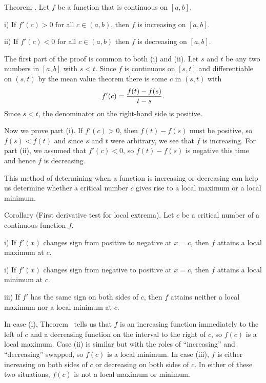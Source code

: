 \edef\thmincrdecr{\the\thmcount}
\proclaim Theorem \advthm. Let $f$ be a function that is continuous on $[a,b]$.
\medskip
\item{i)} If $f'(c) > 0$ for all $c\in (a,b)$, then $f$ is increasing on $[a,b]$.
\smallskip
\item{ii)} If $f'(c) < 0$ for all $c\in (a,b)$ then $f$ is decreasing on $[a,b]$.
\medskip

\proof
The first part of
the proof is common to both (i) and (ii).
Let $s$ and $t$ be any two numbers in $[a,b]$ with $s<t$.
Since $f$ is continuous on $[s,t]$ and differentiable
on $(s,t)$ by the mean value theorem there is some $c$ in $(s,t)$ with
$$f'(c) = {f(t) - f(s) \over t-s}.$$
Since $s<t$, the denominator on the right-hand side is positive.

Now we prove part (i). If $f'(c) > 0$, then $f(t) - f(s)$ must be positive, so $f(s)  <f(t)$
and since $s$ and $t$ were arbitrary, we see that $f$ is increasing. For part (ii), we assumed
that $f'(c) < 0$, so $f(t) - f(s)$ is negative this time and hence $f$ is decreasing.\slug

This method of determining when a function is increasing or decreasing can help us determine whether
a critical number $c$ gives rise to a local maximum or a local minimum.

\edef\corfirstderivtest{\the\thmcount}
\parenproclaim Corollary {\advthm} (First derivative test for local extrema).
Let $c$ be a critical number of a continuous
function $f$.
\medskip
\item{i)} If $f'(x)$ changes sign from positive to negative at $x=c$, then $f$ attains a local maximum
at $c$.
\smallskip
\item{i)} If $f'(x)$ changes sign from negative to positive at $x=c$, then $f$ attains a local minimum
at $c$.
\smallskip
\item{iii)} If $f'$ has the same sign on both sides of $c$, then $f$ attains neither a local maximum nor
a local minimum at $c$.
\medskip

\proof In case (i), Theorem~{\thmincrdecr} tells us that $f$ is an increasing function immediately to the
left of $c$ and a decreasing function on the interval to the right of $c$, so $f(c)$ is a local maximum.
Case (ii) is similar but with the roles of ``increasing'' and ``decreasing'' swapped, so $f(c)$ is a local
minimum. In case (iii), $f$ is either increasing on both sides of $c$ or decreasing on both sides of $c$.
In either of these two situations, $f(c)$ is not a local maximum or minimum.\slug

